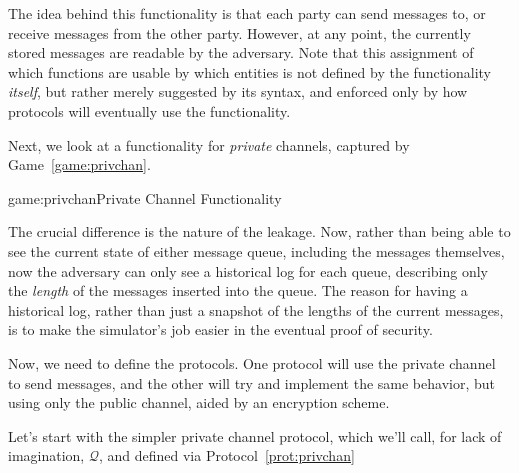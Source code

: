 The idea behind this functionality is that each party can send messages to,
or receive messages from the other party.
However, at any point, the currently stored messages are readable by
the adversary.
Note that this assignment of which functions
are usable by which entities is not defined by the functionality \emph{itself},
but rather merely suggested by its syntax, and enforced only by how
protocols will eventually use the functionality.

Next, we look at a functionality for \emph{private} channels,
captured by Game~\ref{game:privchan}.

\begin{game}{game:privchan}{Private Channel Functionality}
\end{game}

The crucial difference is the nature of the leakage.
Now, rather than being able to see the current state of either message queue,
including the messages themselves, now the adversary can only
see a historical log for each queue, describing only the \emph{length}
of the messages inserted into the queue.
The reason for having a historical log, rather than just a snapshot
of the lengths of the current messages,
is to make the simulator's job easier
in the eventual proof of security.

Now, we need to define the protocols.
One protocol will use the private channel to send messages,
and the other will try and implement the same behavior,
but using only the public channel, aided by an encryption scheme.

Let's start with the simpler private channel protocol, which we'll
call, for lack of imagination, $\mathcal{Q}$,
and defined via Protocol~\ref{prot:privchan}

